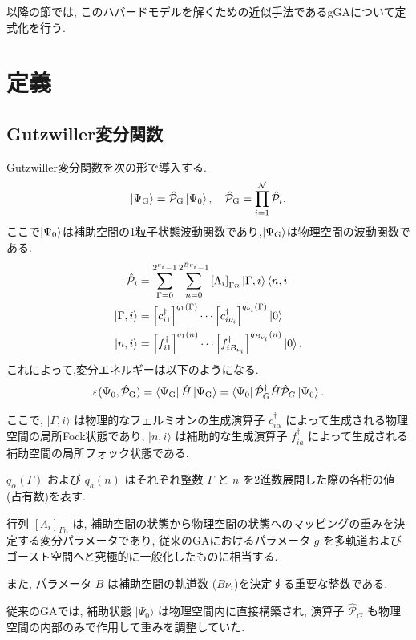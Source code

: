 以降の節では, このハバードモデルを解くための近似手法であるgGAについて定式化を行う.
\section{定義}
\subsection{Gutzwiller変分関数}
Gutzwiller変分関数を次の形で導入する.
\begin{equation}
\Ket{\Psi_{\text{G}}}=\hat{\mathcal{P}}_{\text{G}}\Ket{\Psi_{0}},\quad\hat{\mathcal{P}}_{\text{G}}=\prod_{i=1}^{\mathcal{N}}\hat{\mathcal{P}}_{i}.
\end{equation}
ここで\(\Ket{\Psi_{0}}\)は補助空間の1粒子状態波動関数であり,\(\Ket{\Psi_{\text{G}}}\)は物理空間の波動関数である.
\begin{align}
    \hat{\mathcal{P}}_{i}&=\sum_{\Gamma=0}^{2^{\nu_{i}}-1}\sum_{n=0}^{2^{B\nu_{i}}-1}\left[ \Lambda_{i} \right]_{\Gamma{n}}\Ket{\Gamma,i}\Bra{n,i}\\
    \Ket{\Gamma,i}&=\left[ c^\dagger_{i1} \right]^{q_{1}(\Gamma)}\cdots \left[ c^\dagger_{i\nu_{i}} \right]^{q_{\nu_{i}}(\Gamma)}\Ket{0}\\
    \Ket{n,i}&=\left[ f^\dagger_{i1} \right]^{q_{1}(n)}\cdots \left[ f^\dagger_{iB_{\nu_{i}}} \right]^{q_{B_{\nu_{i}}}(n)}\Ket{0}.
\end{align}
これによって,変分エネルギーは以下のようになる.
\begin{equation}
  \varepsilon(\Psi_{0},\hat{\mathcal{P}}_{\text{G}})=\Bra{\Psi_{\text{G}}}\hat{H}\Ket{\Psi_{\text{G}}}=\Bra{\Psi_{0}}\hat{\mathcal{P}}^\dagger_{G}\hat{H}\hat{\mathcal{P}}_{G}\Ket{\Psi_{0}}. \label{ve-1}
\end{equation}

ここで, $|\Gamma, i\rangle$ は物理的なフェルミオンの生成演算子 $c_{i\alpha}^\dagger$ によって生成される物理空間の局所Fock状態であり, $|n, i\rangle$ は補助的な生成演算子 $f_{ia}^\dagger$ によって生成される補助空間の局所フォック状態である. 

$q_\alpha(\Gamma)$ および $q_a(n)$ はそれぞれ整数 $\Gamma$ と $n$ を2進数展開した際の各桁の値 (占有数)を表す. 

行列 $[\Lambda_i]_{\Gamma n}$ は, 補助空間の状態から物理空間の状態へのマッピングの重みを決定する変分パラメータであり, 従来のGAにおけるパラメータ $g$ を多軌道およびゴースト空間へと究極的に一般化したものに相当する. 

また, パラメータ $B$ は補助空間の軌道数 ($B\nu_i$)を決定する重要な整数である. 

従来のGAでは, 補助状態 $|\Psi_0\rangle$ は物理空間内に直接構築され, 演算子 $\hat{\mathcal{P}}_G$ も物理空間の内部のみで作用して重みを調整していた. 

